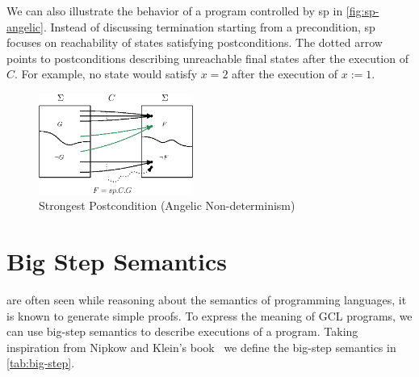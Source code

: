We can also illustrate the behavior of a program controlled by sp in \autoref{fig:sp-angelic}. 
Instead of discussing termination starting from a precondition, sp focuses on reachability of states satisfying postconditions. 
The dotted arrow points to postconditions describing unreachable final states after the execution of $C$. 
For example, no state would satisfy $x=2$ after the execution of $x:=1$. 

\begin{figure}[ht!]\centering
\includegraphics[width=0.45\textwidth]{image/sp-angelic.eps}
\caption{Strongest Postcondition (Angelic Non-determinism)}
\label{fig:sp-angelic}
\end{figure}


\section{Big Step Semantics}\label{sec:big-step}
 are often seen while reasoning about the semantics of programming languages, it is known to generate simple proofs. 
To express the meaning of GCL programs, we can use big-step semantics to describe executions of a program. 
Taking inspiration from Nipkow and Klein's book~\cite{nipkow2014} we define the big-step semantics in \autoref{tab:big-step}. 

